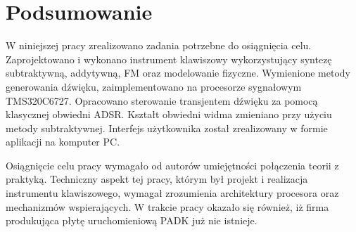 \chapter{Podsumowanie}
W niniejszej pracy zrealizowano zadania potrzebne do osiągnięcia celu. Zaprojektowano i wykonano instrument klawiszowy wykorzystujący syntezę subtraktywną, addytywną, FM oraz modelowanie fizyczne. Wymienione metody generowania dźwięku, zaimplementowano na procesorze sygnałowym TMS320C6727. Opracowano sterowanie transjentem dźwięku za pomocą klasycznej obwiedni ADSR. Kształt obwiedni widma zmieniano przy użyciu metody subtraktywnej. Interfejs użytkownika został zrealizowany w formie aplikacji na komputer PC.





Osiągnięcie celu pracy wymagało od autorów umiejętności połączenia teorii z praktyką. Techniczny aspekt tej pracy, którym był projekt i realizacja instrumentu klawiszowego, wymagał zrozumienia architektury procesora oraz mechanizmów wspierających. W trakcie pracy okazało się również, iż firma produkująca płytę uruchomieniową PADK już nie istnieje.


